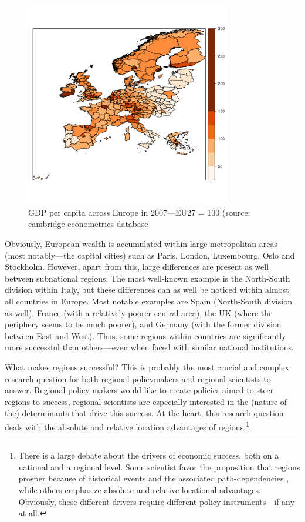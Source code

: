 \documentclass[11pt,parskip,abstracton,notitlepage]{scrartcl}
\begin{document}
\begin{figure}[h]
	\center
	\includegraphics[width=0.8\textwidth]{fig/gdppc}
	\caption{GDP per capita across Europe in 2007---EU27 = 100 (source: cambridge econometrics database}
	\label{fig:gdppc}
\end{figure}

Obviously, European wealth is accumulated within large metropolitan areas (most notably---the capital cities) such as Paris, London, Luxembourg, Oslo and Stockholm. However, apart from this, large differences are present as well between subnational regions. The most well-known example is the North-South division within Italy, but these differences can as well be noticed within almost all countries in Europe. Most notable examples are Spain (North-South division as well), France (with a relatively poorer central area), the UK (where the periphery seems to be much poorer), and Germany (with the former division between East and West). Thus, some regions within countries are significantly more successful than others---even when faced with similar national institutions. 

What makes regions successful? This is probably the most crucial and complex research question for both regional policymakers and regional scientists to answer. Regional policy makers would like to create policies aimed to steer regions to success, regional scientists are especially interested in the (nature of the) determinants that drive this success. At the heart, this research question deals with the absolute and relative location advantages of regions.\footnote{There is a large debate about the drivers of economic success, both on a national and a regional level. Some scientist favor the proposition that regions prosper because of historical events and the associated path-dependencies \citep[e.g.,][]{LANDES1998}, while others emphasize absolute \citep[e.g.][]{diamond1998guns} and relative \citep[e.g.,][]{FUJITA1999} locational advantages. Obviously, these different drivers require different policy instruments---if any at all.}
\end{document}
